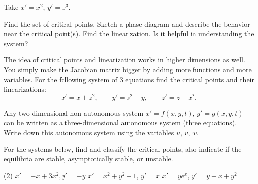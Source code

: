 \documentclass{ximera}
\begin{document}
\begin{exercise}
    Take $x'=x^2$, \enspace $y'=x^3$.
    \begin{tasks}
        \task Find the set of critical points.
        \task Sketch a phase diagram and describe the behavior near the critical point(s).
        \task Find the linearization.  Is it helpful in understanding the system?
    \end{tasks}
\end{exercise}


\begin{exercise}%
    The idea of critical points and linearization works in higher dimensions as well.  You simply make the Jacobian matrix bigger by adding more functions and more variables.  For the following system of 3 equations find the critical points and their linearizations:
    \begin{equation*}
        x' = x + z^2, \qquad y' = z^2-y, \qquad z' = z+x^2.
    \end{equation*}
\end{exercise}


\begin{exercise}%
    Any two-dimensional non-autonomous system $x'=f(x,y,t)$, $y'=g(x,y,t)$ can be written as a three-dimensional autonomous system (three equations).  Write down this autonomous system using the variables $u$, $v$, $w$.
\end{exercise}

\begin{exercise}
    For the systems below, find and classify the critical points, also indicate if the equilibria are stable, asymptotically stable, or unstable.
    \begin{tasks}(2)
        \task $x'=-x+3x^2, y'=-y$
        \task $x'=x^2+y^2-1$, $y'=x$
        \task $x'=ye^x$, $y'=y-x+y^2$
    \end{tasks}
\end{exercise}
\end{document}
